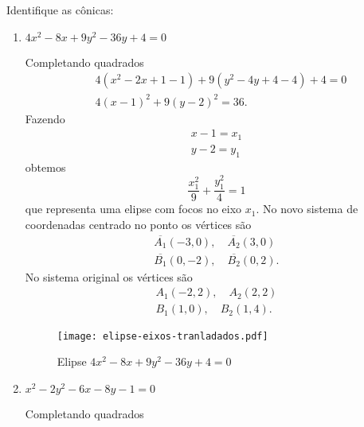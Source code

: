 \begin{exemplos}
  Identifique as c\^onicas:
  \begin{enumerate}
    \item $4x^2 - 8x + 9y^2 - 36y + 4 = 0$
    \begin{solucao}
      Completando quadrados
      \begin{align*}
        &4(x^2 - 2x + 1 - 1) + 9(y^2 - 4y + 4 - 4) + 4 = 0\\
        &4(x - 1)^2 + 9(y - 2)^2 = 36.
      \end{align*}
      Fazendo
      \begin{align*}
        x - 1 = x_1\\
        y - 2 = y_1
      \end{align*}
      obtemos
      \[
        \dfrac{x_1^2}{9} + \dfrac{y_1^2}{4} = 1
      \]
      que representa uma elipse com focos no eixo $x_1$. No novo sistema de coordenadas centrado no ponto os v\'ertices s\~ao
      \begin{align*}
        \overline{A_1}(-3,0),\quad \overline{A_2}(3,0)\\
        \overline{B_1}(0,-2),\quad \overline{B_2}(0,2).
      \end{align*}
      No sistema original os v\'ertices s\~ao
      \begin{align*}
        A_1(-2,2),\quad A_2(2,2)\\
        B_1(1,0),\quad B_2(1,4).
      \end{align*}
       \begin{figure}[!h]
        \centering
        \caption{Elipse $4x^2 - 8x + 9y^2 - 36y + 4 = 0$}
        \texttt{[image: elipse-eixos-tranladados.pdf]}
      \end{figure}
    \end{solucao}
    \item $x^2 - 2y^2 - 6x - 8y - 1 = 0$
    \begin{solucao}
      Completando quadrados
      \begin{align*}

\end{align*}
\end{solucao}
\end{enumerate}
\end{exemplos}
